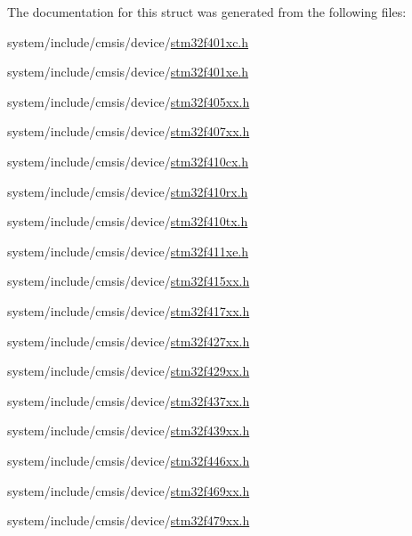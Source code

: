 The documentation for this struct was generated from the following files\+:\begin{DoxyCompactItemize}
\item 
system/include/cmsis/device/\hyperlink{stm32f401xc_8h}{stm32f401xc.\+h}\item 
system/include/cmsis/device/\hyperlink{stm32f401xe_8h}{stm32f401xe.\+h}\item 
system/include/cmsis/device/\hyperlink{stm32f405xx_8h}{stm32f405xx.\+h}\item 
system/include/cmsis/device/\hyperlink{stm32f407xx_8h}{stm32f407xx.\+h}\item 
system/include/cmsis/device/\hyperlink{stm32f410cx_8h}{stm32f410cx.\+h}\item 
system/include/cmsis/device/\hyperlink{stm32f410rx_8h}{stm32f410rx.\+h}\item 
system/include/cmsis/device/\hyperlink{stm32f410tx_8h}{stm32f410tx.\+h}\item 
system/include/cmsis/device/\hyperlink{stm32f411xe_8h}{stm32f411xe.\+h}\item 
system/include/cmsis/device/\hyperlink{stm32f415xx_8h}{stm32f415xx.\+h}\item 
system/include/cmsis/device/\hyperlink{stm32f417xx_8h}{stm32f417xx.\+h}\item 
system/include/cmsis/device/\hyperlink{stm32f427xx_8h}{stm32f427xx.\+h}\item 
system/include/cmsis/device/\hyperlink{stm32f429xx_8h}{stm32f429xx.\+h}\item 
system/include/cmsis/device/\hyperlink{stm32f437xx_8h}{stm32f437xx.\+h}\item 
system/include/cmsis/device/\hyperlink{stm32f439xx_8h}{stm32f439xx.\+h}\item 
system/include/cmsis/device/\hyperlink{stm32f446xx_8h}{stm32f446xx.\+h}\item 
system/include/cmsis/device/\hyperlink{stm32f469xx_8h}{stm32f469xx.\+h}\item 
system/include/cmsis/device/\hyperlink{stm32f479xx_8h}{stm32f479xx.\+h}\end{DoxyCompactItemize}
